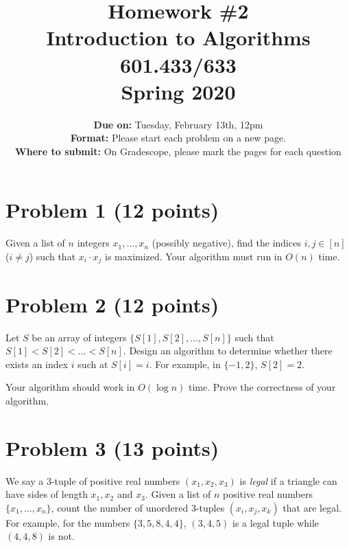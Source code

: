 \documentclass[letterpaper, 11pt]{article}
\begin{document}
\title{Homework \#2 \\ Introduction to Algorithms \\ 601.433/633 \\ Spring 2020}
\author{\textbf{Due on:} Tuesday, February 13th, 12pm \\
\textbf{Format:} Please start each problem on a new page.
\\\textbf{Where to submit:} On Gradescope, please mark the pages for each question
\\}


\maketitle


\section{Problem 1 (12 points)} %
Given a list of $n$ integers $x_1, \dots, x_n$ (possibly negative), find the indices $i, j \in [n]$ ($i \neq j$) such that $x_i \cdot x_j$ is maximized. Your algorithm must run in $O(n)$ time. 



\section{Problem 2 (12 points)}
Let $S$ be an array of integers $\{S[1], S[2],\dots,S[n]\}$ such that $S[1] < S[2] < \dots < S[n]$. Design an algorithm to determine whether there exists an index $i$ such at $S[i] = i.$ For
example, in $\{-1,2\}$, $S[2]= 2$.

Your algorithm should work in $O(\log n)$ time. Prove the correctness of your algorithm.


\section{Problem 3 (13 points) }
We say a 3-tuple of positive real numbers $(x_1, x_2, x_3)$ is \emph{legal} if a triangle can have sides of length $x_1, x_2$ and $x_3$. 
Given a list of $n$ positive real numbers $\{x_1, \dots, x_n\}$, count the number of unordered 3-tuples $(x_i, x_j, x_k)$ that are legal. For example, for the numbers $\{3,5,8,4,4\}$, $(3,4,5)$ is a legal tuple while $(4,4,8)$ is not.
\end{document}
